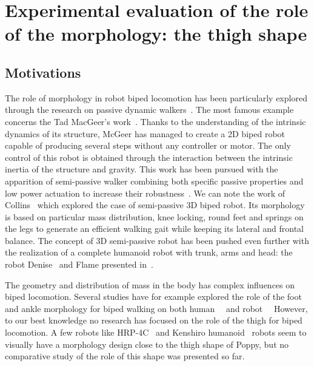 
\newpage
\section{Experimental evaluation of the role of the morphology: the thigh shape} %
\label{sec:morphology-role}

\subsection{Motivations} %

The role of morphology in robot biped locomotion has been particularly explored through the research on passive dynamic walkers~\cite{wisse2007passive}. The most famous example concerns the Tad MacGeer's work~\cite{mcgeer1990passive}. Thanks to the understanding of the intrinsic dynamics of its structure, McGeer has managed to create a 2D biped robot capable of producing several steps without any controller or motor.
The only control of this robot is obtained through the interaction between the intrinsic inertia of the structure and gravity.
This work has been pursued with the apparition of semi-passive walker combining both specific passive properties and low power actuation to increase their robustness~\cite{Anderson2005}. We can note the work of Collins~\cite{collins2005bipedal} which explored the case of semi-passive 3D biped robot. Its morphology is based on particular mass distribution, knee locking, round feet and springs on the legs to generate an efficient walking gait while keeping its lateral and frontal balance.
The concept of 3D semi-passive robot has been pushed even further with the realization of a complete humanoid robot with trunk, arms and head: the robot Denise~\cite{wisse2005three} and Flame presented in~\cite{Hobbelen2008}.

The geometry and distribution of mass in the body has complex influences on biped locomotion. Several studies have for example explored the role of the foot and ankle morphology for biped walking on both human~\cite{Adamczyk2006}~\cite{Hughes1990} and robot~\cite{hobbelen2005ankle}~\cite{Davis2010} However, to our best knowledge no research has focused on the role of the thigh for biped locomotion.  A few robots like HRP-4C~\cite{kaneko2009cybernetic} and Kenshiro humanoid~\cite{nakanishi2013design} robots seem to visually have a morphology design close to the thigh shape of Poppy, but no comparative study of the role of this shape was presented so far.

